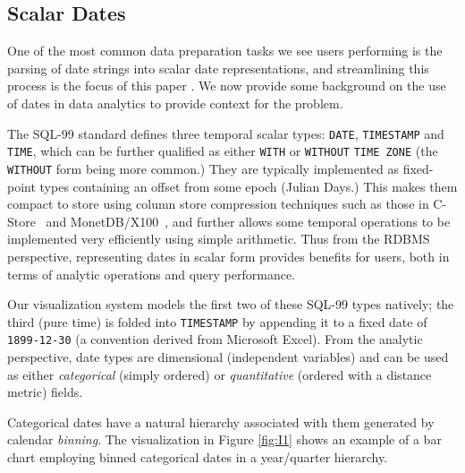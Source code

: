 \subsection{Scalar Dates}

One of the most common data preparation tasks we see users performing is the parsing of date strings into scalar date representations, and streamlining this process is the focus of this paper . We now provide some background on the use of dates in data analytics to provide context for the problem. 

The SQL-99 standard defines three temporal scalar types: \texttt{DATE}, \texttt{TIMESTAMP} and \texttt{TIME}, which can be further qualified as either \texttt{WITH} or \texttt{WITHOUT} \texttt{TIME ZONE} (the \texttt{WITHOUT} form being more common.) They are typically implemented as fixed-point types containing an offset from some epoch (\eg Julian Days.) This makes them compact to store using column store compression techniques such as those in C-Store~\cite{Stonebraker:2005} and MonetDB/X100~\cite{Zukowski:2006}, and further allows some temporal operations to be implemented very efficiently using simple arithmetic. Thus from the RDBMS perspective, representing dates in scalar form provides  benefits for users, both in terms of analytic operations and query performance.

Our visualization system models the first two of these SQL-99 types natively; the third (pure time) is folded into \texttt{TIMESTAMP} by appending it to a fixed date of \texttt{1899-12-30} (a convention derived from Microsoft Excel). From the analytic perspective, date types are dimensional (\ie independent variables) and can be used as either \textit{categorical} (simply ordered) or \textit{quantitative} (ordered with a distance metric) fields.

Categorical dates have a natural hierarchy associated with them generated by calendar \textit{binning}. The visualization in Figure \ref{fig:I1} shows an example of a bar chart employing binned categorical dates in a year/quarter hierarchy.

